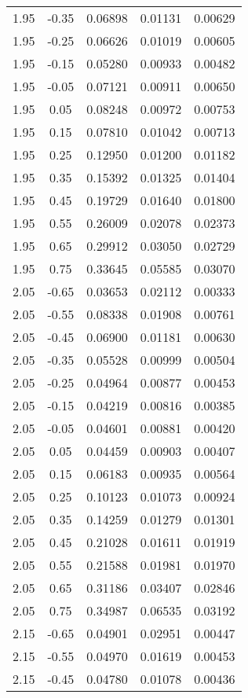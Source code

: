 \begin{longtable}{ccccc}
1.95 & -0.35 & 0.06898 & 0.01131 & 0.00629 \\ 
1.95 & -0.25 & 0.06626 & 0.01019 & 0.00605 \\ 
1.95 & -0.15 & 0.05280 & 0.00933 & 0.00482 \\ 
1.95 & -0.05 & 0.07121 & 0.00911 & 0.00650 \\ 
1.95 & 0.05 & 0.08248 & 0.00972 & 0.00753 \\ 
1.95 & 0.15 & 0.07810 & 0.01042 & 0.00713 \\ 
1.95 & 0.25 & 0.12950 & 0.01200 & 0.01182 \\ 
1.95 & 0.35 & 0.15392 & 0.01325 & 0.01404 \\ 
1.95 & 0.45 & 0.19729 & 0.01640 & 0.01800 \\ 
1.95 & 0.55 & 0.26009 & 0.02078 & 0.02373 \\ 
1.95 & 0.65 & 0.29912 & 0.03050 & 0.02729 \\ 
1.95 & 0.75 & 0.33645 & 0.05585 & 0.03070 \\ \hline
2.05 & -0.65 & 0.03653 & 0.02112 & 0.00333 \\ 
2.05 & -0.55 & 0.08338 & 0.01908 & 0.00761 \\ 
2.05 & -0.45 & 0.06900 & 0.01181 & 0.00630 \\ 
2.05 & -0.35 & 0.05528 & 0.00999 & 0.00504 \\ 
2.05 & -0.25 & 0.04964 & 0.00877 & 0.00453 \\ 
2.05 & -0.15 & 0.04219 & 0.00816 & 0.00385 \\ 
2.05 & -0.05 & 0.04601 & 0.00881 & 0.00420 \\ 
2.05 & 0.05 & 0.04459 & 0.00903 & 0.00407 \\ 
2.05 & 0.15 & 0.06183 & 0.00935 & 0.00564 \\ 
2.05 & 0.25 & 0.10123 & 0.01073 & 0.00924 \\ 
2.05 & 0.35 & 0.14259 & 0.01279 & 0.01301 \\ 
2.05 & 0.45 & 0.21028 & 0.01611 & 0.01919 \\ 
2.05 & 0.55 & 0.21588 & 0.01981 & 0.01970 \\ 
2.05 & 0.65 & 0.31186 & 0.03407 & 0.02846 \\ 
2.05 & 0.75 & 0.34987 & 0.06535 & 0.03192 \\ \hline
2.15 & -0.65 & 0.04901 & 0.02951 & 0.00447 \\ 
2.15 & -0.55 & 0.04970 & 0.01619 & 0.00453 \\ 
2.15 & -0.45 & 0.04780 & 0.01078 & 0.00436 \\ 

\end{longtable}
